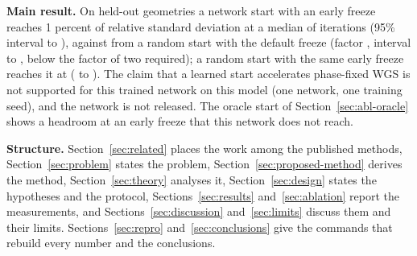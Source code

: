 \textbf{Main result.} On held-out geometries a network start with an early freeze reaches 1 percent of relative standard deviation at a median of \itNThree{} iterations (95\% interval \itNThreeLo{} to \itNThreeHi),
against \itRTwelve{} from a random start with the default freeze (factor \ratioRoverN{}, interval \ratioRoverNLo{} to \ratioRoverNHi, below the factor of two required); a random start with the same early freeze reaches it at \itRThree{}
(\itRThreeLo{} to \itRThreeHi). The claim that a learned start accelerates phase-fixed WGS is not supported for this trained network on this model (one network, one training seed), and the network is not released. The oracle start of Section~\ref{sec:abl-oracle} shows a headroom at an early freeze that this network does not reach.

\textbf{Structure.} Section~\ref{sec:related} places the work among the published methods, Section~\ref{sec:problem} states the problem, Section~\ref{sec:proposed-method} derives the method,
Section~\ref{sec:theory} analyses it, Section~\ref{sec:design} states the hypotheses and the protocol, Sections~\ref{sec:results} and~\ref{sec:ablation} report the measurements, and Sections~\ref{sec:discussion}
and~\ref{sec:limits} discuss them and their limits. Sections~\ref{sec:repro} and~\ref{sec:conclusions} give the commands that rebuild every number and the conclusions.
